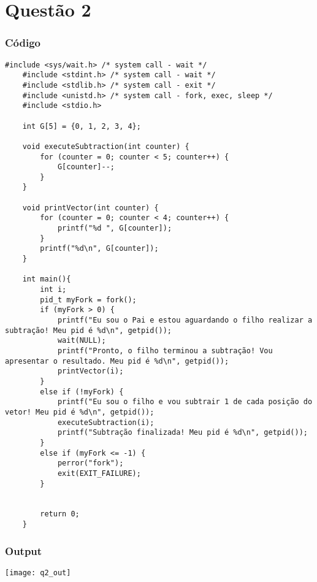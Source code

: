 \graphicspath{ {./images/} }

\chapter{Questão 2}

\subsection*{Código}

\begin{lstlisting}[style=CStyle]
    #include <sys/wait.h> /* system call - wait */
    #include <stdint.h> /* system call - wait */
    #include <stdlib.h> /* system call - exit */
    #include <unistd.h> /* system call - fork, exec, sleep */
    #include <stdio.h>
    
    int G[5] = {0, 1, 2, 3, 4};
    
    void executeSubtraction(int counter) {
        for (counter = 0; counter < 5; counter++) {
            G[counter]--;
        }    
    }
    
    void printVector(int counter) {
        for (counter = 0; counter < 4; counter++) {
            printf("%d ", G[counter]);
        }
        printf("%d\n", G[counter]);
    }
    
    int main(){
        int i;
        pid_t myFork = fork();
        if (myFork > 0) {
            printf("Eu sou o Pai e estou aguardando o filho realizar a subtração! Meu pid é %d\n", getpid());
            wait(NULL);
            printf("Pronto, o filho terminou a subtração! Vou apresentar o resultado. Meu pid é %d\n", getpid());
            printVector(i);
        }
        else if (!myFork) {
            printf("Eu sou o filho e vou subtrair 1 de cada posição do vetor! Meu pid é %d\n", getpid());
            executeSubtraction(i);
            printf("Subtração finalizada! Meu pid é %d\n", getpid());
        }
        else if (myFork <= -1) {
            perror("fork");
            exit(EXIT_FAILURE);
        }
    
    
        return 0;   
    }    
\end{lstlisting}

\subsection*{Output}
\texttt{[image: q2\_out]}

